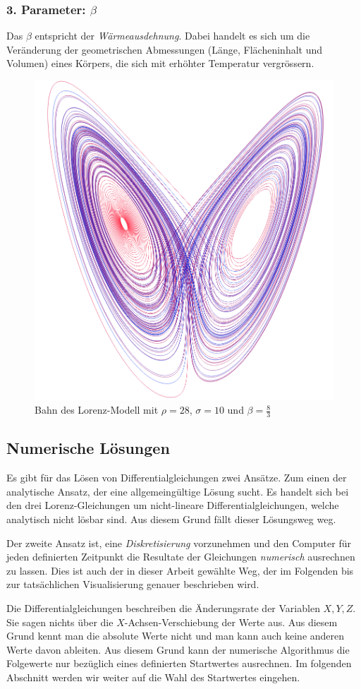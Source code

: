 \subsubsection{3. Parameter: $\beta$}
Das $ \beta $ entspricht der {\em Wärmeausdehnung}. Dabei handelt es sich um die Veränderung der geometrischen Abmessungen (Länge, Flächeninhalt und Volumen) eines Körpers, die sich mit erhöhter Temperatur vergrössern.
%

\begin{figure}
	\centering
	\includegraphics[width=0.3\linewidth]{lorenz/assets/lorenz-modell/lorenz-modell}
	\caption{Bahn des Lorenz-Modell mit $\rho = 28$, $\sigma = 10$ und $\beta = \frac{8}{3}$}
	\label{fig:lorenz-modell}
\end{figure}


\subsection{Numerische Lösungen}
Es gibt für das Lösen von Differentialgleichungen zwei Ansätze. Zum einen der analytische Ansatz, der eine allgemeingültige Lösung sucht. Es handelt sich bei den drei Lorenz-Gleichungen um nicht-lineare Differentialgleichungen, welche analytisch nicht lösbar sind. Aus diesem Grund fällt dieser Lösungsweg weg. 

Der zweite Ansatz ist, eine {\em Diskretisierung} vorzunehmen und den Computer für jeden definierten Zeitpunkt die Resultate der Gleichungen {\em numerisch} ausrechnen zu lassen. Dies ist auch der in dieser Arbeit gewählte Weg, der im Folgenden bis zur tatsächlichen Visualisierung genauer beschrieben wird.
%

Die Differentialgleichungen beschreiben die Änderungsrate der Variablen $ X, Y, Z $. Sie sagen nichts über die $X$-Achsen-Verschiebung der Werte aus. Aus diesem Grund kennt man die absolute Werte nicht und man kann auch keine anderen Werte davon ableiten. Aus diesem Grund kann der numerische Algorithmus die Folgewerte nur bezüglich eines definierten Startwertes ausrechnen. Im folgenden Abschnitt
werden wir weiter auf die Wahl des Startwertes eingehen.

